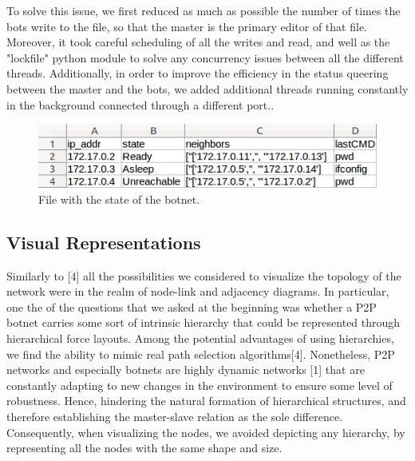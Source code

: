 \documentclass{proc}
\begin{document}
To solve this issue, we first reduced as much as possible the number of times the bots write to the file, so that the master is the primary editor of that file. Moreover, it took careful scheduling of all the writes and read, and well as the "lockfile" python module to solve any concurrency issues between all the different threads. Additionally, in order to improve the efficiency in the status queering between the master and the bots, we added additional threads running constantly in the background connected through a different port..
\begin{figure}
  \includegraphics[width=\linewidth]{CSV.png}
  \caption{File with the state of the botnet.}
  \label{fig1 :bots.csv}
\end{figure}

\subsection{Visual Representations}
Similarly to [4] all the possibilities we considered to visualize the topology of the network were in the realm of node-link and adjacency diagrams. In particular, one the of the questions that we asked at the beginning was whether a P2P botnet carries some sort of intrinsic hierarchy that could be represented through hierarchical force layouts. Among the potential advantages of using hierarchies, we find the ability to mimic real path selection algorithms[4]. Nonetheless, P2P networks and especially botnets are highly dynamic networks [1] that are constantly adapting to new changes in the environment to ensure some level of robustness. Hence, hindering the natural formation of hierarchical structures, and therefore establishing the master-slave relation as the sole difference. Consequently, when visualizing the nodes, we avoided depicting any hierarchy, by representing all the nodes with the same shape and size.  
\end{document}

